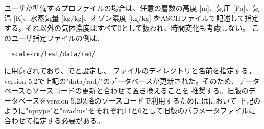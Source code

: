 ユーザが準備するプロファイルの場合は、任意の層数の高度 [m]、気圧 [Pa]、気温 [K]、水蒸気量 [kg/kg]、オゾン濃度 [kg/kg]
をASCIIファイルで記述して指定する。それ以外の気体濃度はすべて0として扱われ、時間変化も考慮しない。
このユーザ指定ファイルの例は、
\begin{verbatim}
  scale-rm/test/data/rad/
\end{verbatim}
に用意されており、でと設定し、
ファイルのディレクトリと名前を指定する。\\

version 5.2で上記の"data/rad/"のデータベースが更新された。そのため、データベースもソースコードの更新と合わせて置き換えることを
推奨する。旧版のデータベースをversion 5.2以降のソースコードで利用するためにはにおいて
下記のように"nptype"と"nradius"をそれぞれ11と6として旧版のパラメータファイルに合わせて指定する必要がある。\\

\\

